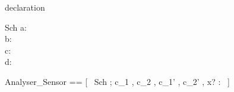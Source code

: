 \begin{zsection}
\SECTION declaration 
\end{zsection}

\begin{schema}{Sch}
a: \nat \\
b: \nat \\
c: \nat \\
d: \nat \\
\end{schema}

\begin{zed}
    Analyser\_Sensor == [~  \Delta Sch ; c\_1 , c\_2 , c\_1' , c\_2' , x? : \nat  ~]
\end{zed}
